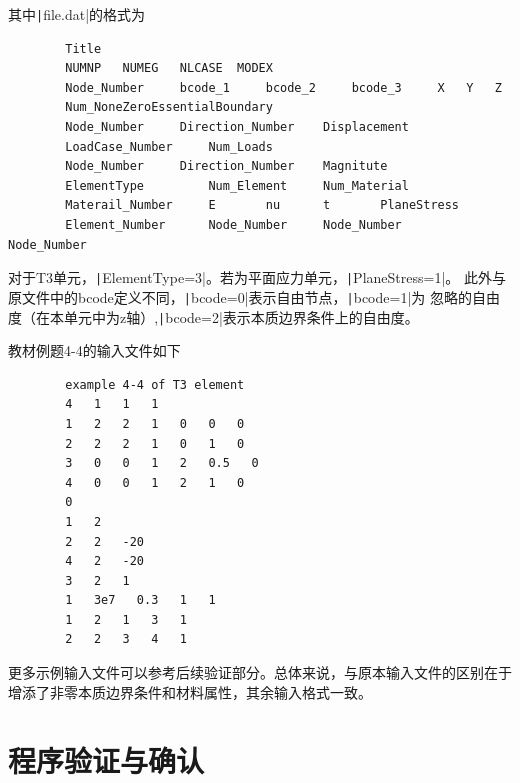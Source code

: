\documentclass[12pt,a4paper]{article}
\newcommand{\code}{\texttt}
\begin{document}
其中\code|file.dat|的格式为
\begin{verbatim}
        Title
        NUMNP   NUMEG   NLCASE  MODEX
        Node_Number     bcode_1     bcode_2     bcode_3     X   Y   Z
        Num_NoneZeroEssentialBoundary
        Node_Number     Direction_Number    Displacement
        LoadCase_Number     Num_Loads
        Node_Number     Direction_Number    Magnitute
        ElementType         Num_Element     Num_Material
        Materail_Number     E       nu      t       PlaneStress
        Element_Number      Node_Number     Node_Number     Node_Number
\end{verbatim}

对于T3单元，\code|ElementType=3|。若为平面应力单元，\code|PlaneStress=1|。
此外与原文件中的bcode定义不同，\code|bcode=0|表示自由节点，\code|bcode=1|为
忽略的自由度（在本单元中为z轴）,\code|bcode=2|表示本质边界条件上的自由度。

教材例题4-4的输入文件如下
\begin{verbatim}
        example 4-4 of T3 element
        4   1   1   1
        1   2   2   1   0   0   0
        2   2   2   1   0   1   0
        3   0   0   1   2   0.5   0
        4   0   0   1   2   1   0
        0
        1   2
        2   2   -20
        4   2   -20
        3   2   1
        1   3e7   0.3   1   1   
        1   2   1   3   1
        2   2   3   4   1
\end{verbatim}

更多示例输入文件可以参考后续验证部分。总体来说，与原本输入文件的区别在于
增添了非零本质边界条件和材料属性，其余输入格式一致。


\section{程序验证与确认}
\end{document}

